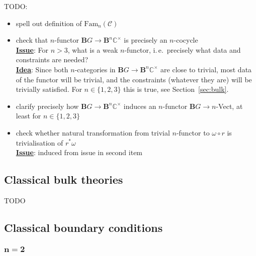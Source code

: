 \documentclass[12pt]{scrartcl}
\newcommand{\Ccal}{\mathcal C}
\newcommand{\boldB}{\boldsymbol{B}}
\newcommand{\C}{\mathds{C}}
\theoremstyle{definition}
\numberwithin{equation}{section}
\numberwithin{definition}{section}
\numberwithin{figure}{section}
\begin{document}
TODO: 
\begin{itemize}
\item 
spell out definition of $\textrm{Fam}_n(\Ccal)$
\item
check that $n$-functor $\boldB G \to \boldB^n \C^\times$ is precisely an $n$-cocycle
\\
\underline{\textbf{Issue}}: For $n>3$, what is a weak $n$-functor, i.\,e.~precisely what data and constraints are needed?
\\
\underline{\textbf{Idea}}: Since both $n$-categories in $\boldB G \to \boldB^n \C^\times$ are close to trivial, most data of the functor will be trivial, and the constraints (whatever they are) will be trivially satisfied. 
For $n \in \{1,2,3\}$ this is true, see Section~\ref{sec:bulk}. 
\item 
clarify precisely how $\boldB G \to \boldB^n \C^\times$ induces an $n$-functor $\boldB G \to n$-Vect, at least for $n \in \{1,2,3\}$
\item 
check whether natural transformation from trivial $n$-functor to $\omega \circ r$ is trivialisation of $r^* \omega$
\\
\underline{\textbf{Issue}}: induced from issue in second item
\end{itemize}


\subsection{Classical bulk theories}

TODO 

\subsection{Classical boundary conditions}

\subsubsection[$n=2$]{$\boldsymbol{n=2}$}
\end{document}
